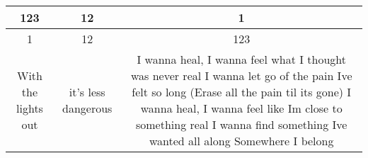 \begin{tabular}{ |c|c|c| }
\hline
123 & 12 & 1 \\
\hline
1 & 12 & 123 \\
\hline
With the lights out & it's less dangerous & I wanna heal, I wanna feel what I thought was never real    I wanna let go of the pain Ive felt so long    (Erase all the pain til its gone)    I wanna heal, I wanna feel like Im close to something real    I wanna find something Ive wanted all along    Somewhere I belong \\
\hline
\end{tabular}

